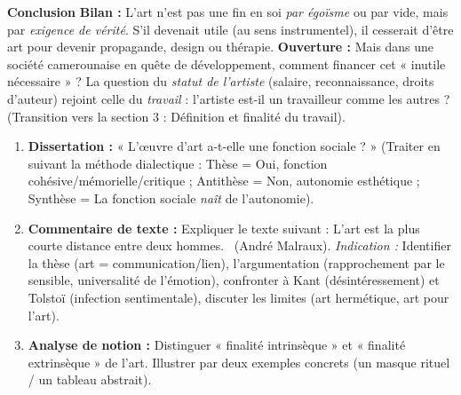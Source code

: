 \documentclass[11pt]{article}
\begin{document}
\begin{exoresolu}
\textbf{Conclusion}
\textbf{Bilan :} L'art n'est pas une fin en soi \emph{par égoïsme} ou par vide, mais par \emph{exigence de vérité}. S'il devenait utile (au sens instrumentel), il cesserait d'être art pour devenir propagande, design ou thérapie.
\textbf{Ouverture :} Mais dans une société camerounaise en quête de développement, comment financer cet « inutile nécessaire » ? La question du \emph{statut de l'artiste} (salaire, reconnaissance, droits d'auteur) rejoint celle du \emph{travail} : l'artiste est-il un travailleur comme les autres ? (Transition vers la section 3 : Définition et finalité du travail).
\end{exoresolu}

\begin{exercice}
\begin{enumerate}
    \item \textbf{Dissertation :} « L'œuvre d'art a-t-elle une fonction sociale ? » (Traiter en suivant la méthode dialectique : Thèse = Oui, fonction cohésive/mémorielle/critique ; Antithèse = Non, autonomie esthétique ; Synthèse = La fonction sociale \emph{naît} de l'autonomie).
    \item \textbf{Commentaire de texte :} Expliquer le texte suivant : \guillemotleft L'art est la plus courte distance entre deux hommes. \guillemotright\ (André Malraux). \textit{Indication :} Identifier la thèse (art = communication/lien), l'argumentation (rapprochement par le sensible, universalité de l'émotion), confronter à Kant (désintéressement) et Tolstoï (infection sentimentale), discuter les limites (art hermétique, art pour l'art).
    \item \textbf{Analyse de notion :} Distinguer « finalité intrinsèque » et « finalité extrinsèque » de l'art. Illustrer par deux exemples concrets (un masque rituel / un tableau abstrait).
\end{enumerate}
\end{exercice}
\end{document}

